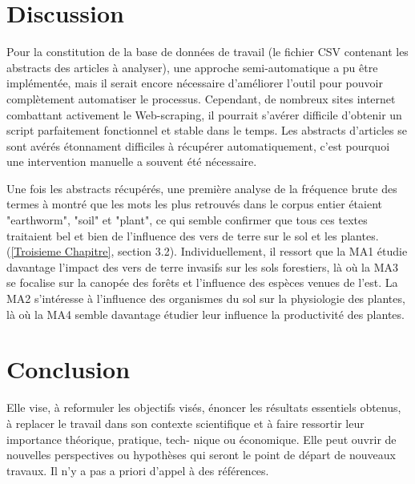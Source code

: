 \documentclass{book}
\begin{document}
\chapter{\label{Quatrieme Chapitre}Discussion}
\noindent
Pour la constitution de la base de données de travail (le fichier CSV contenant les abstracts des articles à analyser), une approche semi-automatique a pu être implémentée, mais il serait encore nécessaire d'améliorer l'outil pour pouvoir complètement automatiser le processus. Cependant, de nombreux sites internet combattant activement le Web-scraping, il pourrait s'avérer difficile d'obtenir un script parfaitement fonctionnel et stable dans le temps. Les abstracts d'articles se sont avérés étonnament difficiles à récupérer automatiquement, c'est pourquoi une intervention manuelle a souvent été nécessaire.

Une fois les abstracts récupérés, une première analyse de la fréquence brute des termes à montré que les mots les plus retrouvés dans le corpus entier étaient "earthworm", "soil" et "plant", ce qui semble confirmer que tous ces textes traitaient bel et bien de l'influence des vers de terre sur le sol et les plantes. (\cref{Troisieme Chapitre}, section 3.2). Individuellement, il ressort que la MA1 étudie davantage l'impact des vers de terre invasifs sur les sols forestiers, là où la MA3 se focalise sur la canopée des forêts et l'influence des espèces venues de l'est. La MA2 s'intéresse à l'influence des organismes du sol sur la physiologie des plantes, là où la MA4 semble davantage étudier leur influence la productivité des plantes.   

\thispagestyle{fancy}

\chapter{\label{Cinquième Chapitre}Conclusion}
Elle vise, à reformuler les objectifs visés, énoncer les résultats essentiels
obtenus, à replacer le
travail dans son contexte scientifique et à faire ressortir leur importance
théorique, pratique, tech-
nique ou économique. Elle peut ouvrir de nouvelles perspectives ou hypothèses
qui seront le point
de départ de nouveaux travaux. Il n'y a pas a priori d'appel à des références.

\thispagestyle{fancy}

\newpage


\thispagestyle{fancy}
\end{document}
